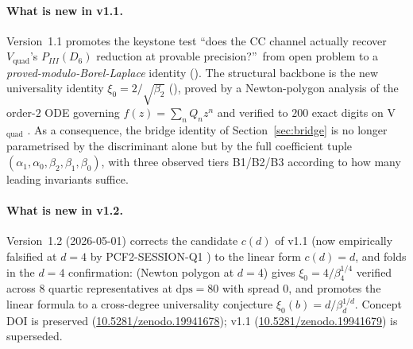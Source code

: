 \documentclass[11pt,reqno]{amsart}
\theoremstyle{plain}
\theoremstyle{definition}
\theoremstyle{remark}
\newcommand{\CC}{\mathrm{CC}}
\newcommand{\Vquad}{V_{\mathrm{quad}}}
\begin{document}
\paragraph{What is new in v1.1.}
Version~1.1 promotes the keystone test
``does the $\CC$ channel actually recover $\Vquad$'s
$P_{III}(D_6)$ reduction at provable precision?''\
from open problem to a \emph{proved-modulo-Borel-Laplace}
identity (). The structural backbone is
the new universality identity
$\xi_0 = 2/\sqrt{\beta_2}$ (), proved by a
Newton-polygon analysis of the order-$2$ ODE governing
$f(z) = \sum_{n} Q_n z^n$ and verified to $200$ exact digits
on V$_{\text{quad}}$ \cite{siarc_cc_pipeline_g}. As a
consequence, the bridge identity of Section~\ref{sec:bridge}
is no longer parametrised by the discriminant alone but by
the full coefficient tuple
$(\alpha_1, \alpha_0, \beta_2, \beta_1, \beta_0)$, with three
observed tiers B1/B2/B3 according to how many leading
invariants suffice.

\paragraph{What is new in v1.2.}
Version~1.2 (2026-05-01) corrects the candidate $c(d)$ of
v1.1 (now empirically falsified at $d=4$ by
PCF2-SESSION-Q1 \cite{siarc_pcf2_session_q1}) to the linear
form $c(d) = d$, and folds in the $d=4$ confirmation:
 (Newton polygon at $d=4$) gives
$\xi_0 = 4/\beta_4^{1/4}$ verified across $8$ quartic
representatives at $\mathrm{dps}=80$ with spread $0$, and
 promotes the linear formula to a
cross-degree universality conjecture
$\xi_0(b) = d/\beta_d^{1/d}$. Concept DOI is preserved
(\href{https://doi.org/10.5281/zenodo.19941678}{10.5281/zenodo.19941678});
v1.1 (\href{https://doi.org/10.5281/zenodo.19941679}{10.5281/zenodo.19941679})
is superseded.
\end{document}
